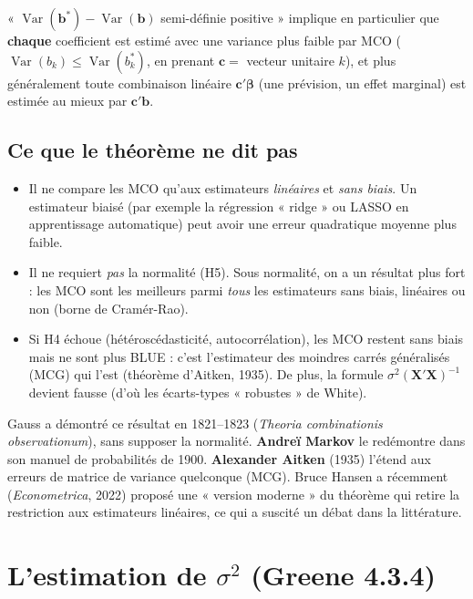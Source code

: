 \documentclass[11pt,a4paper]{article}
\newcommand{\vX}{\mathbf{X}}
\newcommand{\vb}{\mathbf{b}}
\newcommand{\vbeta}{\bm{\beta}}
\newcommand{\XtXi}{(\vX'\vX)^{-1}}
\newcommand{\Var}{\operatorname{Var}}
\begin{document}
\begin{intuition}
« $\Var(\vb^*)-\Var(\vb)$ semi-définie positive » implique en particulier que \textbf{chaque} coefficient est estimé avec une variance plus faible par MCO ($\Var(b_k)\le\Var(b_k^*)$, en prenant $\mathbf c=$ vecteur unitaire $k$), et plus généralement toute combinaison linéaire $\mathbf c'\vbeta$ (une prévision, un effet marginal) est estimée au mieux par $\mathbf c'\vb$.
\end{intuition}

\subsection{Ce que le théorème ne dit pas}
\begin{itemize}
\item Il ne compare les MCO qu'aux estimateurs \emph{linéaires} et \emph{sans biais}. Un estimateur biaisé (par exemple la régression « ridge » ou LASSO en apprentissage automatique) peut avoir une erreur quadratique moyenne plus faible.
\item Il ne requiert \emph{pas} la normalité (H5). Sous normalité, on a un résultat plus fort : les MCO sont les meilleurs parmi \emph{tous} les estimateurs sans biais, linéaires ou non (borne de Cramér-Rao).
\item Si H4 échoue (hétéroscédasticité, autocorrélation), les MCO restent sans biais mais ne sont plus BLUE : c'est l'estimateur des moindres carrés généralisés (MCG) qui l'est (théorème d'Aitken, 1935). De plus, la formule $\sigma^2\XtXi$ devient fausse (d'où les écarts-types « robustes » de White).
\end{itemize}

\begin{histoire}
Gauss a démontré ce résultat en 1821--1823 (\emph{Theoria combinationis observationum}), sans supposer la normalité. \textbf{Andreï Markov} le redémontre dans son manuel de probabilités de 1900. \textbf{Alexander Aitken} (1935) l'étend aux erreurs de matrice de variance quelconque (MCG). Bruce Hansen a récemment (\emph{Econometrica}, 2022) proposé une « version moderne » du théorème qui retire la restriction aux estimateurs linéaires, ce qui a suscité un débat dans la littérature.
\end{histoire}

\section{L'estimation de $\sigma^2$ (Greene 4.3.4)}\label{sec:sigma2}
\end{document}
